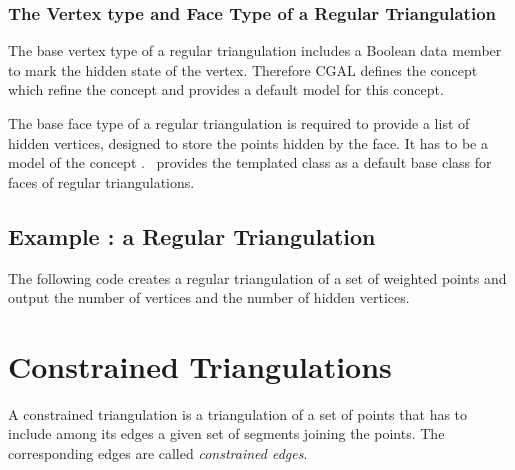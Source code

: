 \subsubsection{The Vertex type and Face Type of a Regular Triangulation}

The base vertex type of a regular triangulation
includes a Boolean data member to mark the hidden state of the vertex.
Therefore  CGAL defines the concept
 which refine
the concept 
and provides a default model 
for this concept.

The base face type of a regular triangulation
is required to provide a list of hidden vertices,
designed to store the points hidden by the face. It has to be a model
of the concept .
\cgal\ provides the templated class 
as a default base class for faces of regular triangulations.



\subsection{Example : a Regular Triangulation\label{Subsection_2D_Triangulations_Regular_Example}}

The following code  creates a regular triangulation 
of a set of weighted points and output the number
of vertices and the number of hidden vertices.



\section{Constrained Triangulations\label{Section_2D_Triangulations_Constrained}}

A constrained triangulation is a triangulation of a set of points
that has to include among its edges 
a given set of segments joining the points. The corresponding 
edges are called {\em constrained edges}. 

